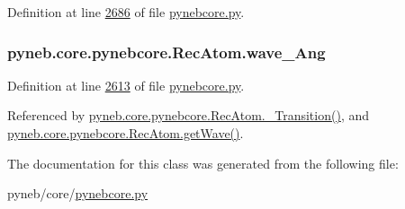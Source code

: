 Definition at line \hyperlink{pynebcore_8py_source_l02686}{2686} of file \hyperlink{pynebcore_8py_source}{pynebcore.\+py}.

\hypertarget{classpyneb_1_1core_1_1pynebcore_1_1_rec_atom_aa2fd61021ea3067af77e7ee0053ace11}{}
\subsubsection[{wave\+\_\+\+Ang}]{\setlength{\rightskip}{0pt plus 5cm}pyneb.\+core.\+pynebcore.\+Rec\+Atom.\+wave\+\_\+\+Ang}\label{classpyneb_1_1core_1_1pynebcore_1_1_rec_atom_aa2fd61021ea3067af77e7ee0053ace11}


Definition at line \hyperlink{pynebcore_8py_source_l02613}{2613} of file \hyperlink{pynebcore_8py_source}{pynebcore.\+py}.



Referenced by \hyperlink{pynebcore_8py_source_l02696}{pyneb.\+core.\+pynebcore.\+Rec\+Atom.\+\_\+\+Transition()}, and \hyperlink{pynebcore_8py_source_l02623}{pyneb.\+core.\+pynebcore.\+Rec\+Atom.\+get\+Wave()}.



The documentation for this class was generated from the following file\+:\begin{DoxyCompactItemize}
\item 
pyneb/core/\hyperlink{pynebcore_8py}{pynebcore.\+py}\end{DoxyCompactItemize}
